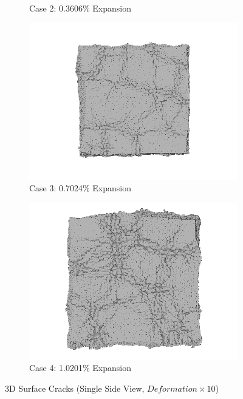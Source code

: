 \begin{figure}[!h]
\begin{subfigure}{.5\textwidth}
    \caption{Case 2: 0.3606\% Expansion}
    \end{subfigure}%
    \begin{subfigure}{.5\textwidth}
      \centering
      \includegraphics[width=.9\linewidth]{Files/exp_3D/ASR/A30P25_3_3ds.png}
    \caption{Case 3: 0.7024\% Expansion}
    \end{subfigure}
    \begin{subfigure}{.5\textwidth}
      \centering
      \includegraphics[width=.8\linewidth]{Files/exp_3D/ASR/A30P25_4_3ds.png}
    \caption{Case 4: 1.0201\% Expansion}
    \end{subfigure}%

  \caption{3D Surface Cracks (Single Side View, $Deformation \times 10$)}
  \label{fig:ASR_A30P25_3DS}
\end{figure}

